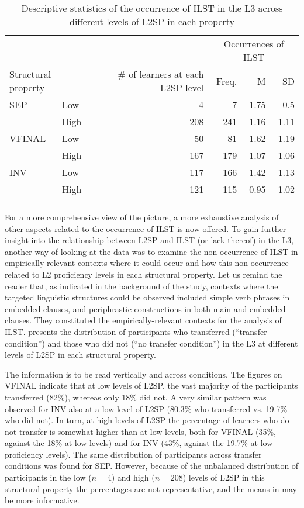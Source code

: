\documentclass[output=paper,modfonts,nonflat, newtxmath]{langsci/langscibook}
\begin{document}
\begin{table}
\caption{Descriptive statistics of the occurrence of ILST in the L3 across different levels of L2SP in each property\label{tab:sanchez7:5}}
\begin{tabularx}{\textwidth}{XXrrrr}

\lsptoprule
 &	& & \multicolumn{3}{c}{Occurrences of ILST}\\
\cmidrule{4-6}
\multicolumn{2}{l}{Structural property} & \# of learners at each L2SP level & {Freq.} & {M} & {SD}\\
\midrule
SEP & Low &  4 &  7 &  1.75 & 0.5 \\
 	& High & 208 & 241 & 1.16 & 1.11\\
\tablevspace
VFINAL & Low &  50 &  81 &  1.62 &  1.19\\
		& High & 167 & 179 & 1.07 & 1.06\\
\tablevspace
INV & Low & 117 &  166 &  1.42 &  1.13\\
	& High & 121 & 115 & 0.95 & 1.02\\
\lspbottomrule
\end{tabularx}
\end{table}

For a more comprehensive view of the picture, a more exhaustive analysis of other aspects related to the occurrence of ILST is now offered. To gain further insight into the relationship between L2SP and ILST (or lack thereof) in the L3, another way of looking at the data was to examine the non-occurrence of ILST in empirically-relevant contexts where it could occur and how this non-occurrence related to L2 proficiency levels in each structural property. Let us remind the reader that, as indicated in the background of the study, contexts where the targeted linguistic structures could be observed included simple verb phrases in embedded clauses, and periphrastic constructions in both main and embedded clauses. They constituted the empirically-relevant contexts for the analysis of ILST.  presents the distribution of participants who transferred (``transfer condition'') and those who did not (``no transfer condition'') in the L3 at different levels of L2SP in each structural property.

 The information is to be read vertically and across conditions. The figures on VFINAL indicate that at low levels of L2SP, the vast majority of the participants transferred (82\%), whereas only 18\% did not. A very similar pattern was observed for INV also at a low level of L2SP (80.3\% who transferred vs. 19.7\% who did not). In turn, at high levels of L2SP the percentage of learners who do not transfer is somewhat higher than at low levels, both for VFINAL (35\%, against the 18\% at low levels) and for INV (43\%, against the 19.7\% at low proficiency levels). The same distribution of participants across transfer conditions was found for SEP. However, because of the unbalanced distribution of participants in the low ($n = 4$) and high ($n = 208$) levels of L2SP in this structural property the percentages are not representative, and the means in  may be more informative.
\end{document}
